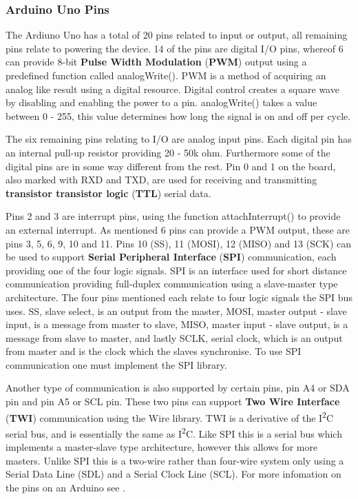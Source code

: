 \subsubsection{Arduino Uno Pins}\label{subsubsec:arduino-uno-pins}
The Ardiuno Uno has a total of 20 pins related to input or output, all remaining pins relate to powering the device.
14 of the pins are digital I/O pins, whereof 6 can provide 8-bit \textbf{Pulse Width Modulation} (\textbf{PWM}) output using a predefined function called analogWrite(). %
PWM is a method of acquiring an analog like result using a digital resource.
Digital control creates a square wave by disabling and enabling the power to a pin.
analogWrite() takes a value between 0 - 255, this value determines how long the signal is on and off per cycle.

The six remaining pins relating to I/O are analog input pins.
Each digital pin has an internal pull-up resistor providing 20 - 50k ohm.
Furthermore some of the digital pins are in some way different from the rest.
Pin 0 and 1 on the board, also marked with RXD and TXD, are used for receiving and transmitting \textbf{transistor transistor logic} (\textbf{TTL}) serial data. %


Pins 2 and 3 are interrupt pins, using the function attachInterrupt() to provide an external interrupt. %
As mentioned 6 pins can provide a PWM output, these are pins 3, 5, 6, 9, 10 and 11.
Pins 10 (SS), 11 (MOSI), 12 (MISO) and 13 (SCK) can be used to support \textbf{Serial Peripheral Interface} (\textbf{SPI}) communication, each providing one of the four logic signals. %
SPI is an interface used for short distance communication providing full-duplex communication using a slave-master type architecture.
The four pins mentioned each relate to four logic signals the SPI bus uses.
SS, slave select, is an output from the master, MOSI, master output - slave input, is a message from master to slave, MISO, master input - slave output, is a message from slave to master, and lastly SCLK, serial clock, which is an output from master and is the clock which the slaves synchronise.
To use SPI communication one must implement the SPI library.

Another type of communication is also supported by certain pins, pin A4 or SDA pin and pin A5 or SCL pin.
These two pins can support \textbf{Two Wire Interface} (\textbf{TWI}) communication using the Wire library. %
TWI is a derivative of the I\textsuperscript{2}C serial bus, and is essentially the same as I\textsuperscript{2}C.
Like SPI this is a serial bus which implements a master-slave type architecture, however this allows for more masters.
Unlike SPI this is a two-wire rather than four-wire system only using a Serial Data Line (SDL) and a Serial Clock Line (SCL).
For more infomation on the pins on an Arduino see \cite{ArduinoUNO}.
